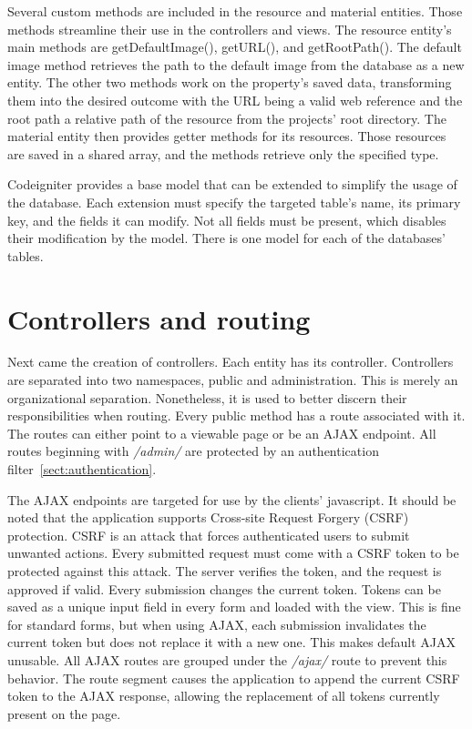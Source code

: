\documentclass[
  digital,     %
  oneside,     %
  nosansbold,  %
  colorbold, %
  lof,         %
  lot,         %
]{fithesis4}
\begin{document}
Several custom methods are included in the resource and material entities. Those methods streamline their use in the controllers and views. The resource entity's main methods are getDefaultImage(), getURL(), and getRootPath(). The default image method retrieves the path to the default image from the database as a new entity. The other two methods work on the property's saved data, transforming them into the desired outcome with the URL being a valid web reference and the root path a relative path of the resource from the projects' root directory. The material entity then provides getter methods for its resources. Those resources are saved in a shared array, and the methods retrieve only the specified type.

Codeigniter provides a base model that can be extended to simplify the usage of the database. Each extension must specify the targeted table's name, its primary key, and the fields it can modify. Not all fields must be present, which disables their modification by the model. There is one model for each of the databases' tables.

\section{Controllers and routing}

Next came the creation of controllers. Each entity has its controller. Controllers are separated into two namespaces, public and administration. This is merely an organizational separation. Nonetheless, it is used to better discern their responsibilities when routing. Every public method has a route associated with it. The routes can either point to a viewable page or be an AJAX endpoint. All routes beginning with \textit{/admin/} are protected by an authentication filter~\ref{sect:authentication}.

The AJAX endpoints are targeted for use by the clients' javascript. It should be noted that the application supports Cross-site Request Forgery (CSRF) protection. CSRF is an attack that forces authenticated users to submit unwanted actions. Every submitted request must come with a CSRF token to be protected against this attack. The server verifies the token, and the request is approved if valid. Every submission changes the current token. Tokens can be saved as a unique input field in every form and loaded with the view. This is fine for standard forms, but when using AJAX, each submission invalidates the current token but does not replace it with a new one. This makes default AJAX unusable. All AJAX routes are grouped under the \textit{/ajax/} route to prevent this behavior. The route segment causes the application to append the current CSRF token to the AJAX response, allowing the replacement of all tokens currently present on the page.
\end{document}
